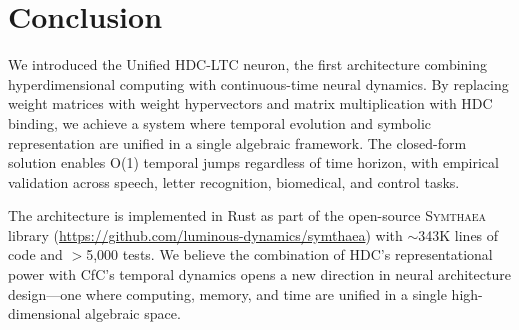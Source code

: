 \documentclass{article}
\newcommand{\symthaea}{\textsc{Symthaea}}
\begin{document}
\section{Conclusion}
\label{sec:conclusion}

We introduced the Unified HDC-LTC neuron, the first architecture combining hyperdimensional computing with continuous-time neural dynamics. By replacing weight matrices with weight hypervectors and matrix multiplication with HDC binding, we achieve a system where temporal evolution and symbolic representation are unified in a single algebraic framework. The closed-form solution enables O(1) temporal jumps regardless of time horizon, with empirical validation across speech, letter recognition, biomedical, and control tasks.

The architecture is implemented in Rust as part of the open-source \symthaea{} library (\url{https://github.com/luminous-dynamics/symthaea}) with $\sim$343K lines of code and $>$5,000 tests. We believe the combination of HDC's representational power with CfC's temporal dynamics opens a new direction in neural architecture design---one where computing, memory, and time are unified in a single high-dimensional algebraic space.

\end{document}
